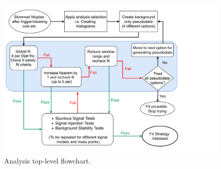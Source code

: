  
\begin{figure}[htb]
\centering
\includegraphics[width=1.2\textwidth]{fig/flowcharts/QGDijet-FlowChart-30March}
\caption{Analysis top-level flowchart.
\label{eflow}}
\end{figure}
%
%
%
